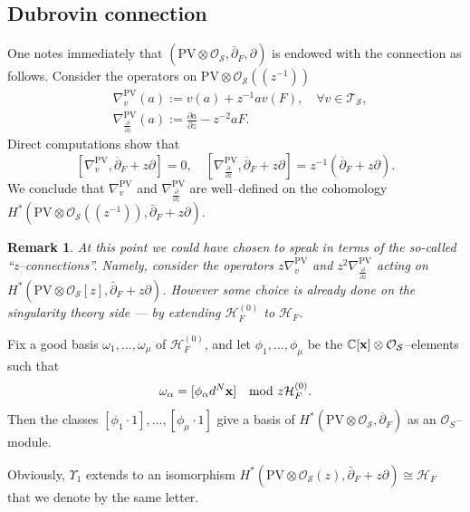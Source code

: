 \documentclass[12pt,a4paper]{amsart}
\newcommand{\CC}{{\mathbb{C}}}
\newcommand{\bx}{{\bf x}}
\def\H{{\mathcal H}}
\def\O{{\mathcal O}}
\def\T{{\mathcal T}}
\renewcommand{\S}{{\mathcal S}}
\newcommand{\p}{{\partial}}
\newcommand{\<}{\left<}
\renewcommand{\>}{\right>}
\newcommand{\PV}{{\mathrm{PV}}}
\newtheorem{remark}[theorem]{Remark}
\numberwithin{equation}{section}
\begin{document}
\subsection{Dubrovin connection}
One notes immediately that $(\PV \otimes \O_\S, \bar \p_F, \p)$ is endowed with the connection as follows. Consider the operators on $\PV \otimes \O_\S((z^{-1}))$
\begin{align}
    & \nabla_v^\PV (a) := v(a) + z^{-1} a v(F), \quad \forall v \in \T_\S,
    \\
    & \nabla_{\frac{\p}{\p z}}^\PV (a) := \frac{\p a}{\p z} - z^{-2} a F.
\end{align}
Direct computations show that
\[
    [\nabla_v^\PV, \overline\p_F + z  \p] = 0, \quad [\nabla_{\frac{\p}{\p z}}^\PV, \overline \p_F + z \p] = z^{-1} (\overline \p_F + z \p).
\]
We conclude that $\nabla_v^\PV$ and $\nabla_{\frac{\p}{\p z}}^\PV$ are well--defined on the cohomology $H^\ast( \PV \otimes \O_\S((z^{-1})), \bar \p_F + z\p)$.

\begin{remark}
    At this point we could have chosen to speak in terms of the so-called ``z--connections''. Namely, consider the operators $z \nabla_v^\PV$ and $z^2 \nabla_{\frac{\p}{\p z}}^\PV$ acting on $H^\ast( \PV \otimes \O_\S[z], {\bar \p_F + z\p})$.
    However some choice is already done on the singularity theory side --- by extending $\H_F^{(0)}$ to $\H_F$.
\end{remark}


Fix a good basis $\omega_1,\dots,\omega_\mu$ of $\H_F^{(0)}$, and let $\phi_1,\dots,\phi_\mu$ be the $\CC[\bx]\otimes\O_\S$--elements such that
\[
 \omega_\alpha = [ \phi_\alpha d^N\bx] \ \mod z\H_F^{(0)}.
\]
Then the classes $[\phi_1 \cdot 1],\dots,[\phi_\mu \cdot 1]$ give a basis of $H^\ast(\PV \otimes \O_\S,\overline \p_F)$ as an $\O_S$--module.

Obviously, $\Upsilon_1$ extends to an isomorphism $H^\ast(\PV \otimes \O_\S(z), \bar \p_F + z\p)  \cong \H_F$ that we denote by the same letter.
\end{document}
